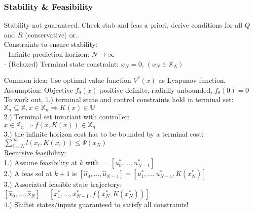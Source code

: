 \documentclass[10pt,parskip]{scrartcl}
\begin{document}
\begin{multicols*}{3}
\subsubsection{Stability \& Feasibility}
Stability not guaranteed. Check stab and feas a priori, derive conditions for all $Q$ and $R$ (conservative) or..\\
Constraints to ensure stability:\\
- Infinite prediction horizon: $N \rightarrow \infty$\\
- (Relaxed) Terminal state constraint: $x_N = 0$, $(x_N \in \mathbb X_N)$

Common idea: Use optimal value function $V^*(x)$ as Lyapunov function.\\
Assumption: Objective $f_0 (x)$ positive definite, radially unbounded, $f_0 (0) = 0$ \\
To work out, 1.) terminal state and control constraints hold in terminal set:
$ \mathbb X_n \subseteq \mathbb X, x \in \mathbb X_n \Rightarrow K(x) \in \mathbb U$\\
2.) Terminal set invariant with controller:\\
\hspace*{8mm}$ x \in \mathbb X_n \Rightarrow f(x,K(x)) \in \mathbb X_n$\\
 3.) the infinite horizon cost has to be bounded
by a terminal cost:
\hspace*{8mm}$\sum\nolimits_{i=N}^{\infty} l(x_i, K(x_i)) \leq \Psi(x_N)$\\
\underline{Recursive feasibility:}\\
1.) Assume feasibility at $k$ with $\mathbb = [u_0^*,...,u_{N-1}^*]$\\
2.) A feas sol at $k+1$ is $[\hat u_0,...,\hat u_{N-1}]=[u_1^*,...,u_{N-1}^*, K(x_N^*)]$\\
3.) Associated feasible state trajectory:\\ \hspace*{8mm}$[\hat x_0,...,\hat x_{N}]=[x_1^*,...,x_{N-1}^*, f(x_N^*,K(x_N^*))]$\\
4.) Shiftet states/inputs guaranteed to satisfy all constraints!



\end{multicols*}
\end{document}
